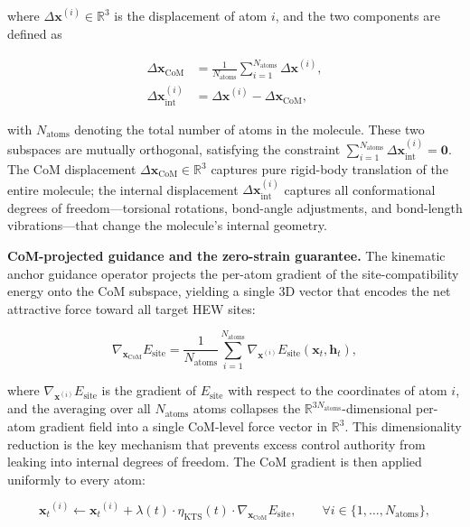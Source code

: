 \documentclass{article}
\newcommand{\reals}{\ensuremath{\mathbb{R}}}
\newcommand{\xt}{\ensuremath{\bm{x}_t}}
\newcommand{\htensor}{\ensuremath{\bm{h}_t}}
\newcommand{\Deltax}{\ensuremath{\Delta\bm{x}}}
\begin{document}
where $\Deltax^{(i)} \in \reals^3$ is the displacement of atom $i$, and the
two components are defined as

\begin{align}
\Deltax_{\text{CoM}} &= \frac{1}{N_{\text{atoms}}} \sum_{i=1}^{N_{\text{atoms}}} \Deltax^{(i)}, \label{eq:com_def} \\
\Deltax_{\text{int}}^{(i)} &= \Deltax^{(i)} - \Deltax_{\text{CoM}}, \label{eq:vint_def}
\end{align}

with $N_{\text{atoms}}$ denoting the total number of atoms in the molecule.
These two subspaces are mutually orthogonal, satisfying the constraint
$\sum_{i=1}^{N_{\text{atoms}}} \Deltax_{\text{int}}^{(i)} = \bm{0}$.
The CoM displacement $\Deltax_{\text{CoM}} \in \reals^3$ captures pure
rigid-body translation of the entire molecule; the internal displacement
$\Deltax_{\text{int}}^{(i)}$ captures all conformational degrees of
freedom---torsional rotations, bond-angle adjustments, and bond-length
vibrations---that change the molecule's internal geometry.

\textbf{CoM-projected guidance and the zero-strain guarantee.}
The kinematic anchor guidance operator projects the per-atom gradient of the
site-compatibility energy onto the CoM subspace, yielding a single 3D vector
that encodes the net attractive force toward all target HEW sites:

\begin{equation}\label{eq:kinematic_grad}
\nabla_{\bm{x}_{\text{CoM}}} E_{\text{site}} =
  \frac{1}{N_{\text{atoms}}} \sum_{i=1}^{N_{\text{atoms}}}
  \nabla_{\bm{x}^{(i)}} E_{\text{site}}(\xt, \htensor),
\end{equation}

where $\nabla_{\bm{x}^{(i)}} E_{\text{site}}$ is the gradient of
$E_{\text{site}}$ with respect to the coordinates of atom $i$, and the
averaging over all $N_{\text{atoms}}$ atoms collapses the
$\reals^{3N_{\text{atoms}}}$-dimensional per-atom gradient field into a single
CoM-level force vector in $\reals^3$.  This dimensionality reduction is the
key mechanism that prevents excess control authority from leaking into
internal degrees of freedom.  The CoM gradient is then applied uniformly to
every atom:

\begin{equation}\label{eq:kinematic_update}
\xt^{(i)} \leftarrow \xt^{(i)} + \lambda(t) \cdot \eta_{\text{KTS}}(t) \cdot
              \nabla_{\bm{x}_{\text{CoM}}} E_{\text{site}},
\qquad \forall i \in \{1, \ldots, N_{\text{atoms}}\},
\end{equation}
\end{document}
